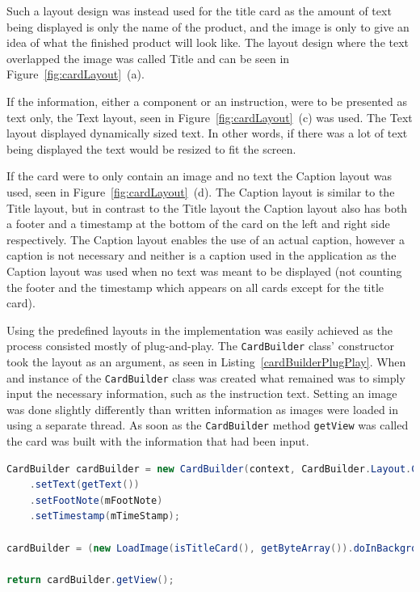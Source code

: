 Such a layout design was instead used for the title card as the amount of text being displayed is only the name of the product, and the image is only to give an idea of what the finished product will look like. The layout design where the text overlapped the image was called Title and can be seen in Figure~\ref{fig:cardLayout}~(a).

If the information, either a component or an instruction, were to be presented as text only, the Text layout, seen in Figure~\ref{fig:cardLayout}~(c) was used. The Text layout displayed dynamically sized text. In other words, if there was a lot of text being displayed the text would be resized to fit the screen.

If the card were to only contain an image and no text the Caption layout was used, seen in Figure~\ref{fig:cardLayout}~(d). The Caption layout is similar to the Title layout, but in contrast to the Title layout the Caption layout also has both a footer and a timestamp at the bottom of the card on the left and right side respectively. The Caption layout enables the use of an actual caption, however a caption is not necessary and neither is a caption used in the application as the Caption layout was used when no text was meant to be displayed (not counting the footer and the timestamp which appears on all cards except for the title card).

Using the predefined layouts in the implementation was easily achieved as the process consisted mostly of plug-and-play. The \texttt{CardBuilder} class' constructor took the layout as an argument, as seen in Listing~\ref{cardBuilderPlugPlay}. When and instance of the \texttt{CardBuilder} class was created what remained was to simply input the necessary information, such as the instruction text. Setting an image was done slightly differently than written information as images were loaded in using a separate thread. As soon as the \texttt{CardBuilder} method \texttt{getView} was called the card was built with the information that had been input.

\begin{lstlisting}[language=Java, caption={Initialisation of the CardBuilder class}, label=cardBuilderPlugPlay]
CardBuilder cardBuilder = new CardBuilder(context, CardBuilder.Layout.COLUMNS)
	.setText(getText())
	.setFootNote(mFootNote)
	.setTimestamp(mTimeStamp);

cardBuilder = (new LoadImage(isTitleCard(), getByteArray()).doInBackground(cardBuilder));

return cardBuilder.getView();
\end{lstlisting}

